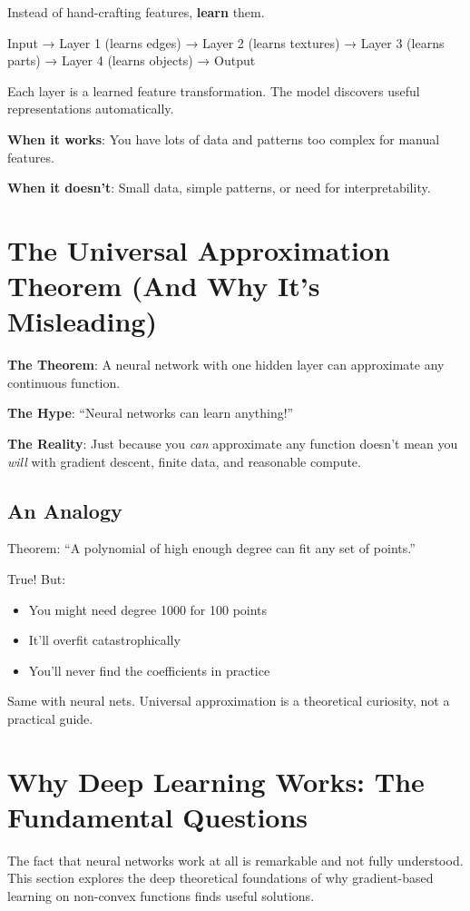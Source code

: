 \documentclass[11pt,oneside]{book}
\begin{document}
Instead of hand-crafting features, \textbf{learn} them.

Input → Layer 1 (learns edges) → Layer 2 (learns textures) → Layer 3 (learns parts) → Layer 4 (learns objects) → Output

Each layer is a learned feature transformation. The model discovers useful representations automatically.

\textbf{When it works}: You have lots of data and patterns too complex for manual features.

\textbf{When it doesn't}: Small data, simple patterns, or need for interpretability.

\section{The Universal Approximation Theorem (And Why It's Misleading)}

\textbf{The Theorem}: A neural network with one hidden layer can approximate any continuous function.

\textbf{The Hype}: ``Neural networks can learn anything!''

\textbf{The Reality}: Just because you \textit{can} approximate any function doesn't mean you \textit{will} with gradient descent, finite data, and reasonable compute.

\subsection{An Analogy}

Theorem: ``A polynomial of high enough degree can fit any set of points.''

True! But:
\begin{itemize}
\item You might need degree 1000 for 100 points
\item It'll overfit catastrophically
\item You'll never find the coefficients in practice
\end{itemize}

Same with neural nets. Universal approximation is a theoretical curiosity, not a practical guide.

\section{Why Deep Learning Works: The Fundamental Questions}

The fact that neural networks work at all is remarkable and not fully understood. This section explores the deep theoretical foundations of why gradient-based learning on non-convex functions finds useful solutions.
\end{document}
